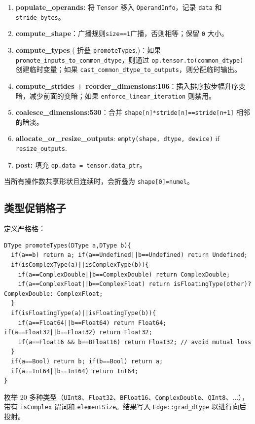 \begin{enumerate}[leftmargin=1.2em]
\item \textbf{populate\_operands:} 将 \texttt{Tensor} 移入 \texttt{OperandInfo}，记录 \texttt{data} 和 \texttt{stride\_bytes}。
\item \textbf{compute\_shape}：广播规则\texttt{size==1}广播，否则相等；保留 \texttt{0} 大小。
\item \textbf{compute\_types} ( 折叠 \texttt{promoteTypes},)：如果 \texttt{promote\_inputs\_to\_common\_dtype}，则通过 \texttt{op.tensor.to(common\_dtype)} 创建临时变量；如果 \texttt{cast\_common\_dtype\_to\_outputs}，则分配临时输出。
\item \textbf{compute\_strides + reorder\_dimensions:106}：插入排序按步幅升序变暗，减少前面的变暗；如果 \texttt{enforce\_linear\_iteration} 则禁用。
\item \textbf{coalesce\_dimensions:530}：合并 \texttt{shape[n]*stride[n]==stride[n+1]} 相邻的暗淡。
\item \textbf{allocate\_or\_resize\_outputs}: \texttt{empty(shape, dtype, device)} if \texttt{resize\_outputs}.
\item \textbf{post:} 填充 \texttt{op.data = tensor.data\_ptr}。
\end{enumerate}

当所有操作数共享形状且连续时，会折叠为 \texttt{shape[0]=numel}。

\subsection{类型促销格子}

定义严格格：

\begin{lstlisting}[caption={lattice (abridged).}, label=lst:promote]
DType promoteTypes(DType a,DType b){
  if(a==b) return a; if(a==Undefined||b==Undefined) return Undefined;
  if(isComplexType(a)||isComplexType(b)){
    if(a==ComplexDouble||b==ComplexDouble) return ComplexDouble;
    if(a==ComplexFloat||b==ComplexFloat) return isFloatingType(other)? ComplexDouble: ComplexFloat;
  }
  if(isFloatingType(a)||isFloatingType(b)){
    if(a==Float64||b==Float64) return Float64; if(a==Float32||b==Float32) return Float32;
    if(a==Float16 && b==BFloat16) return Float32; // avoid mutual loss
  }
  if(a==Bool) return b; if(b==Bool) return a;
  if(a==Int64||b==Int64) return Int64;
}
\end{lstlisting}

枚举 20 多种类型（\texttt{UInt8}、\texttt{Float32}、\texttt{BFloat16}、\texttt{ComplexDouble}、\texttt{QInt8}、...），带有 \texttt{isComplex} 谓词和 \texttt{elementSize}。结果写入 \texttt{Edge::grad\_dtype} 以进行向后投射。

